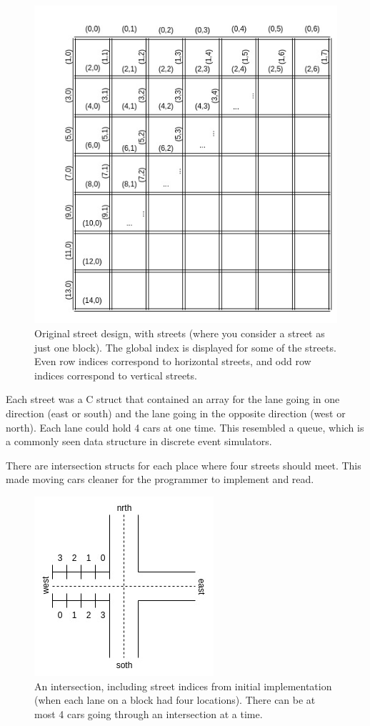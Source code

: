 \documentclass[10pt,a4paper]{article}
\begin{document}
\begin{figure}
    \centering
    \includegraphics[scale=0.4]{parallel.jpg}
    \caption{Original street design, with  streets (where you consider a street as just one block). The global index is displayed for some of the streets. Even row indices correspond to horizontal streets, and odd row indices correspond to vertical streets.}
    \label{fig:my_label}
\end{figure}

Each street was a C struct that contained an array for the lane going in one direction (east or south) and the lane going in the opposite direction (west or north). Each lane could hold 4 cars at one time. This resembled a queue, which is a commonly seen data structure in discrete event simulators.

There are intersection structs for each place where four streets should meet. This made moving cars cleaner for the programmer to implement and read.

\begin{figure}
    \centering
    \includegraphics[scale=0.6]{parallel2.jpg}
    \caption{An intersection, including street indices from initial implementation (when each lane on a block had four locations). There can be at most 4 cars going through an intersection at a time.}
    \label{fig:my_label}
\end{figure}
\end{document}
